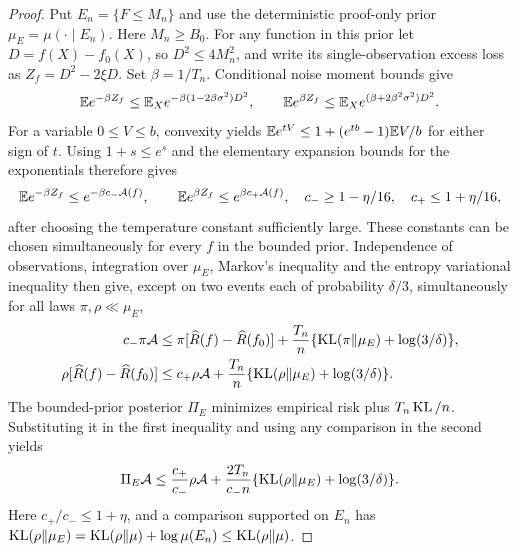 \begin{proof}
Put $E_n=\{F\le M_n\}$ and use the deterministic proof-only prior
$\mu_E=\mu(\cdot\mid E_n)$. Here $M_n\ge B_0$.
For any function in this prior let $D=f(X)-f_0(X)$, so
$D^2\le4M_n^2$, and write its single-observation excess loss as
$Z_f=D^2-2\xi D$. Set $\beta=1/T_n$.
Conditional noise moment bounds give
\[
 \mathbb E e^{-\beta Z_f}\le\mathbb E_X e^{-\beta(1-2\beta\sigma^2)D^2},
 \qquad
 \mathbb E e^{\beta Z_f}\le\mathbb E_X e^{(\beta+2\beta^2\sigma^2)D^2}.
\]
For a variable $0\le V\le b$, convexity yields
$\mathbb E e^{tV}\le1+(e^{tb}-1)\mathbb E V/b$ for either sign of $t$.
Using $1+s\le e^s$ and the elementary expansion bounds for the
exponentials therefore gives
\[
 \mathbb E e^{-\beta Z_f}\le e^{-\beta c_-\mathcal A(f)},
 \qquad
 \mathbb E e^{\beta Z_f}\le e^{\beta c_+\mathcal A(f)},
 \quad
 c_-\ge1-\eta/16,\quad c_+\le1+\eta/16,
\]
after choosing the temperature constant sufficiently large.
These constants can be chosen simultaneously for every $f$ in the
bounded prior. Independence of observations, integration over
$\mu_E$, Markov's inequality and the entropy variational inequality
then give, except on two events each of probability $\delta/3$,
simultaneously for all laws $\pi,\rho\ll\mu_E$,
\begin{align*}
 c_-\pi\mathcal A
 &\le\pi[\widehat R(f)-\widehat R(f_0)]
      +\frac{T_n}{n}\{\operatorname{KL}(\pi\|\mu_E)+\log(3/\delta)\},\\
 \rho[\widehat R(f)-\widehat R(f_0)]
 &\le c_+\rho\mathcal A
      +\frac{T_n}{n}\{\operatorname{KL}(\rho\|\mu_E)+\log(3/\delta)\}.
\end{align*}
The bounded-prior posterior $\Pi_E$ minimizes empirical risk plus
$T_n\operatorname{KL}/n$. Substituting it in the first inequality and using any
comparison in the second yields
\[
 \Pi_E\mathcal A
 \le\frac{c_+}{c_-}\rho\mathcal A
       +\frac{2T_n}{c_-n}
            \{\operatorname{KL}(\rho\|\mu_E)+\log(3/\delta)\}.
\]
Here $c_+/c_-\le1+\eta$, and a comparison supported on $E_n$ has
$\operatorname{KL}(\rho\|\mu_E)=\operatorname{KL}(\rho\|\mu)+\log\mu(E_n)
\le\operatorname{KL}(\rho\|\mu)$.


\end{proof}
